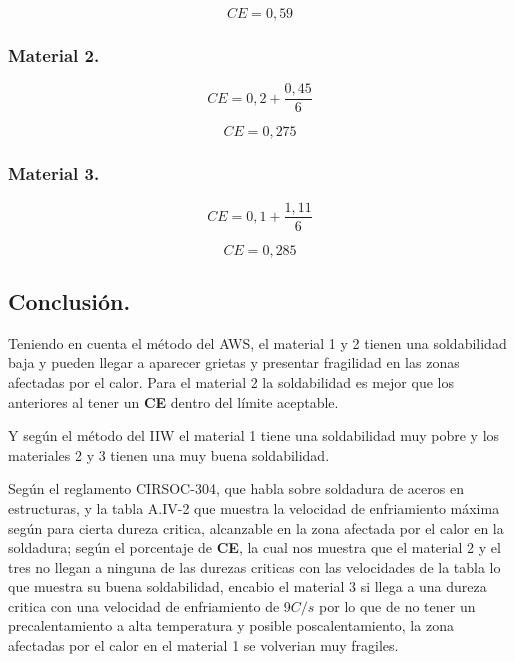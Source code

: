 \documentclass[12pt,a4paper]{article}
\begin{document}
\begin{equation*}
    CE = 0,59
\end{equation*}

\subsubsection{Material 2.}

\begin{equation*}
    CE = 0,2 + \frac{0,45}{6} 
\end{equation*}

\begin{equation*}
    CE = 0,275
\end{equation*}

\subsubsection{Material 3.}

\begin{equation*}
    CE = 0,1 + \frac{1,11}{6} 
\end{equation*}

\begin{equation*}
    CE = 0,285
\end{equation*}

\subsection{Conclusión.}

Teniendo en cuenta el método del AWS, el material 1 y 2 tienen una soldabilidad baja y pueden llegar a aparecer grietas y presentar fragilidad en las zonas afectadas por el calor. Para el material 2 la soldabilidad es mejor que los anteriores al tener un \textbf{CE} dentro del límite aceptable.

Y según el método del IIW el material 1 tiene una soldabilidad muy pobre y los materiales 2 y 3 tienen una muy buena soldabilidad.

Según el reglamento CIRSOC-304, que habla sobre soldadura de aceros en estructuras, y la tabla A.IV-2 que muestra la velocidad de enfriamiento máxima según para cierta dureza critica, alcanzable en la zona afectada por el calor en la soldadura; según el porcentaje de \textbf{CE}, la cual nos muestra que el material 2 y el tres no llegan a ninguna de las durezas criticas con las velocidades de la tabla lo que muestra su buena soldabilidad, encabio el material 3 si llega a una dureza critica con una velocidad de enfriamiento de 9$C/s$ por lo que de no tener un precalentamiento a alta temperatura y posible poscalentamiento, la zona afectadas por el calor en el material 1 se volverian muy fragiles.
\end{document}
